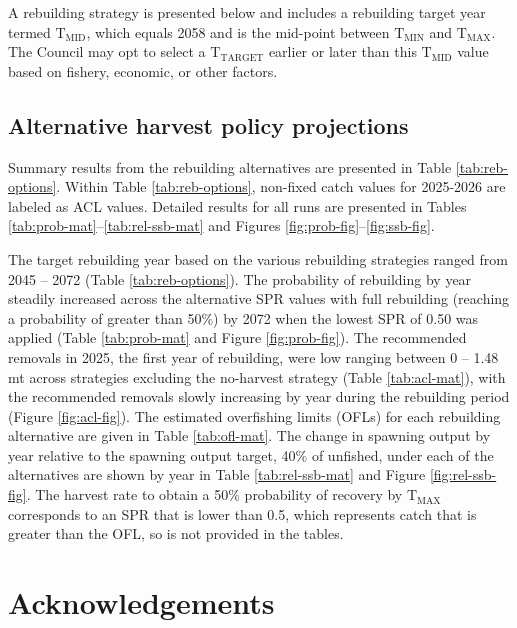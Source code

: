 \documentclass[11pt,
  letterpaper,
]{article}
\begin{document}
A rebuilding strategy is presented below and includes a rebuilding target year termed \(\text{T}_\text{MID}\), which equals 2058 and is the mid-point between \(\text{T}_\text{MIN}\) and \(\text{T}_\text{MAX}\). The Council may opt to select a \(\text{T}_\text{TARGET}\) earlier or later than this \(\text{T}_\text{MID}\) value based on fishery, economic, or other factors.

\hypertarget{alternative-harvest-policy-projections}{%
\subsection{Alternative harvest policy projections}\label{alternative-harvest-policy-projections}}

Summary results from the rebuilding alternatives are presented in Table \ref{tab:reb-options}. Within Table \ref{tab:reb-options}, non-fixed catch values for 2025-2026 are labeled as ACL values. Detailed results for all runs are presented in Tables \ref{tab:prob-mat}--\ref{tab:rel-ssb-mat} and Figures \ref{fig:prob-fig}--\ref{fig:ssb-fig}.

The target rebuilding year based on the various rebuilding strategies ranged from 2045 -- 2072 (Table \ref{tab:reb-options}). The probability of rebuilding by year steadily increased across the alternative SPR values with full rebuilding (reaching a probability of greater than 50\%) by 2072 when the lowest SPR of 0.50 was applied (Table \ref{tab:prob-mat} and Figure \ref{fig:prob-fig}). The recommended removals in 2025, the first year of rebuilding, were low ranging between 0 -- 1.48 mt across strategies excluding the no-harvest strategy (Table \ref{tab:acl-mat}), with the recommended removals slowly increasing by year during the rebuilding period (Figure \ref{fig:acl-fig}). The estimated overfishing limits (OFLs) for each rebuilding alternative are given in Table \ref{tab:ofl-mat}. The change in spawning output by year relative to the spawning output target, 40\% of unfished, under each of the alternatives are shown by year in Table \ref{tab:rel-ssb-mat} and Figure \ref{fig:rel-ssb-fig}. The harvest rate to obtain a 50\% probability of recovery by \(\text{T}_\text{MAX}\) corresponds to an SPR that is lower than 0.5, which represents catch that is greater than the OFL, so is not provided in the tables.

\hypertarget{acknowledgements}{%
\section{Acknowledgements}\label{acknowledgements}}
\end{document}
